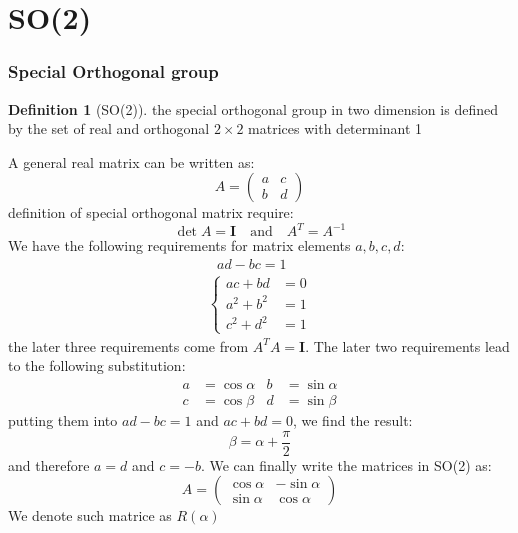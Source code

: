 \documentclass{amsart}
\theoremstyle{remark}
\theoremstyle{remark}
\theoremstyle{definition}
\newtheorem*{definition}{Definition}
\begin{document}
\newpage
\part{SO(2)}

\section*{Special Orthogonal group}
\begin{definition}
    [SO(2)] the special orthogonal group in two dimension is defined by the 
    set of real and orthogonal $2\times 2$ matrices with determinant 1
\end{definition}
A general real matrix can be written as:
\begin{equation*}
    A = \left(\begin{matrix}
        a & c \\ b & d
    \end{matrix}\right)
\end{equation*}
definition of special orthogonal matrix require:
\begin{equation*}
    \det A = \mathbf{I}\quad \text{and} \quad A^T = A^{-1}
\end{equation*}
We have the following requirements for matrix elements $a,b,c,d$:
\begin{gather*}
    \ \ \ ad - bc = 1\\
    \begin{cases}
        ac + bd &= 0\\
        a^2 + b^2 &= 1\\
        c^2 + d^2 &= 1
    \end{cases}
\end{gather*}
the later three requirements come from $A^{T}A = \mathbf{I}$. 
The later two requirements lead to the following substitution:
\begin{align*}
    a &= \cos\alpha &  b &= \sin\alpha \\
    c &= \cos\beta &  d &= \sin\beta 
\end{align*}
putting them into $ad - bc = 1$ and $ac + bd = 0$, we find the result:
\begin{equation*}
    \beta = \alpha + \frac{\pi}{2}
\end{equation*}
and therefore $a = d$ and $c = -b$. We can finally write the matrices in SO(2) as:
\begin{equation*}
    A = \left(\begin{matrix}
        \cos\alpha & -\sin\alpha \\ \sin\alpha & \cos\alpha
    \end{matrix}\right)
\end{equation*}
We denote such matrice as $R(\alpha)$
\end{document}
